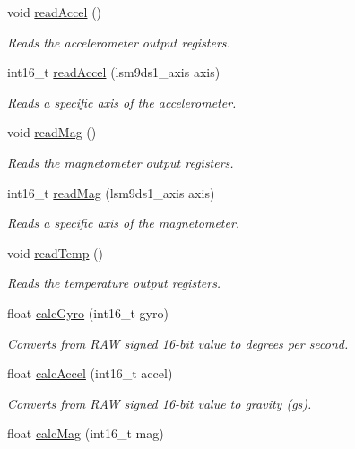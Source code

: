 \begin{DoxyCompactItemize}
void \hyperlink{classLSM9DS1_a9953684a1ff652a7d3a4d91e72bccaa1}{read\+Accel} ()
\begin{DoxyCompactList}\small\item\em Reads the accelerometer output registers. \end{DoxyCompactList}\item 
int16\+\_\+t \hyperlink{classLSM9DS1_acbe3bfc0b8db7fe3f77893d22c394594}{read\+Accel} (lsm9ds1\+\_\+axis axis)
\begin{DoxyCompactList}\small\item\em Reads a specific axis of the accelerometer. \end{DoxyCompactList}\item 
void \hyperlink{classLSM9DS1_ae127cf75aa5f3c5421e49363795dcd38}{read\+Mag} ()
\begin{DoxyCompactList}\small\item\em Reads the magnetometer output registers. \end{DoxyCompactList}\item 
int16\+\_\+t \hyperlink{classLSM9DS1_a615fd3ab32a9af833ef9899663100330}{read\+Mag} (lsm9ds1\+\_\+axis axis)
\begin{DoxyCompactList}\small\item\em Reads a specific axis of the magnetometer. \end{DoxyCompactList}\item 
void \hyperlink{classLSM9DS1_aca21a51dc79a1287b97ed9c326e2080b}{read\+Temp} ()
\begin{DoxyCompactList}\small\item\em Reads the temperature output registers. \end{DoxyCompactList}\item 
float \hyperlink{classLSM9DS1_a76707323565bc4170ea8e27a932c95e4}{calc\+Gyro} (int16\+\_\+t gyro)
\begin{DoxyCompactList}\small\item\em Converts from R\+AW signed 16-\/bit value to degrees per second. \end{DoxyCompactList}\item 
float \hyperlink{classLSM9DS1_a54e2a7888b67b47cf0dd986c5b91a3c5}{calc\+Accel} (int16\+\_\+t accel)
\begin{DoxyCompactList}\small\item\em Converts from R\+AW signed 16-\/bit value to gravity (g\textquotesingle{}s). \end{DoxyCompactList}\item 
float \hyperlink{classLSM9DS1_a7d0b0740497b1a10cd3e46a282a143ec}{calc\+Mag} (int16\+\_\+t mag)

\end{DoxyCompactItemize}
